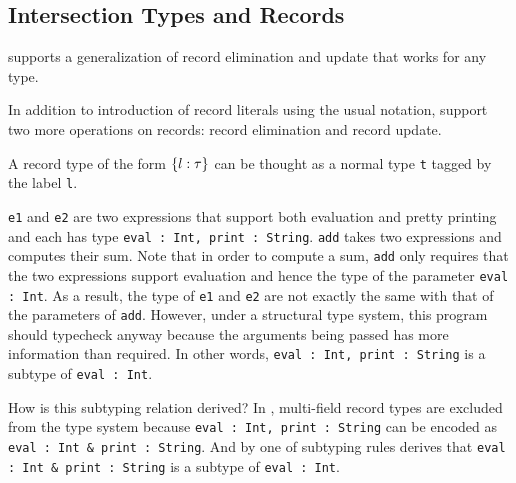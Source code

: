 {\subsection{Intersection Types and Records}

\name supports a generalization of record elimination and update that works for
any type.


In addition to introduction of record literals using the usual
notation, \name support two more operations on records: record
elimination and record update.

A record type of the form $ \{ l : \tau \} $ can be thought as a normal type \lstinline{t}
tagged by the label \lstinline{l}.




\lstinline{e1} and \lstinline{e2} are two expressions that support both evaluation and pretty
printing and each has type \lstinline{eval : Int, print : String}. \lstinline{add} takes
two expressions and computes their sum. Note that in order to compute a sum,
\lstinline{add} only requires that the two expressions support evaluation and hence the
type of the parameter \lstinline{eval : Int}. As a result, the type of \lstinline{e1} and
\lstinline{e2} are not exactly the same with that of the parameters of \lstinline{add}. However,
under a structural type system, this program should typecheck anyway because the
arguments being passed has more information than required. In other words,
\lstinline{eval : Int, print : String} is a subtype of \lstinline{eval : Int}.

How is this subtyping relation derived? In \name, multi-field record types are
excluded from the type system because \lstinline{eval : Int, print : String} can
be encoded as \lstinline{eval : Int & print : String}. And by one of
subtyping rules derives that \lstinline{eval : Int & print : String} is a
subtype of \lstinline{eval : Int}.

}
